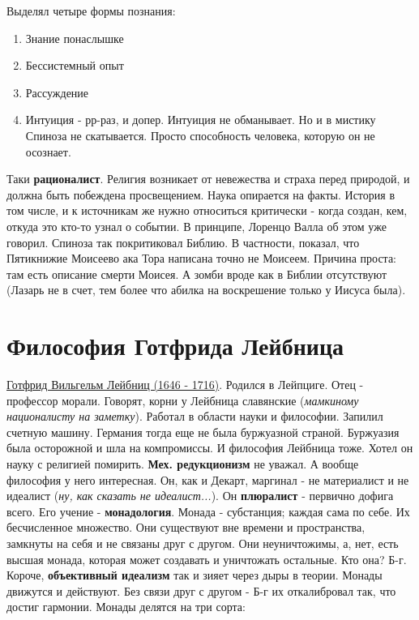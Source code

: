 Выделял четыре формы познания:
\begin{enumerate}
\item Знание понаслышке
\item Бессистемный опыт
\item Рассуждение
\item Интуиция - рр-раз, и допер. Интуиция не обманывает. Но и в мистику Спиноза не скатывается. Просто способность человека, которую он не осознает. 
\end{enumerate}
Таки \textbf{рационалист}. Религия возникает от невежества и страха перед природой, и должна быть побеждена просвещением. Наука опирается на факты. История в том числе, и к источникам же нужно относиться критически - когда создан, кем, откуда это кто-то узнал о событии. В принципе, Лоренцо Валла об этом уже говорил. Спиноза так покритиковал Библию. В частности, показал, что Пятикнижие Моисеево ака Тора написана точно не Моисеем. Причина проста: там есть описание смерти Моисея. А зомби вроде как в Библии отсутствуют (Лазарь не в счет, тем более что абилка на воскрешение только у Иисуса была).

\section{Философия Готфрида Лейбница}
\underline{Готфрид Вильгельм Лейбниц (1646 - 1716)}. Родился в Лейпциге. Отец - профессор морали. Говорят, корни у Лейбница славянские (\textit{мамкиному националисту на заметку}). Работал в области науки и философии. Запилил счетную машину. Германия тогда еще не была буржуазной страной. Буржуазия была осторожной и шла на компромиссы. И философия Лейбница тоже. Хотел он науку с религией помирить. \textbf{Мех. редукционизм} не уважал. А вообще философия у него интересная. Он, как и Декарт, маргинал - не материалист и не идеалист (\textit{ну, как сказать не идеалист...}). Он \textbf{плюралист} - первично дофига всего. Его учение - \textbf{монадология}. Монада - субстанция; каждая сама по себе. Их бесчисленное множество. Они существуют вне времени и пространства, замкнуты на себя и не связаны друг с другом. Они неуничтожимы, а, нет, есть высшая монада, которая может создавать и уничтожать остальные. Кто она? Б-г. Короче, \textbf{объективный идеализм} так и зияет через дыры в теории. Монады движутся и действуют. Без связи друг с другом - Б-г их откалибровал так, что достиг гармонии. Монады делятся на три сорта:

